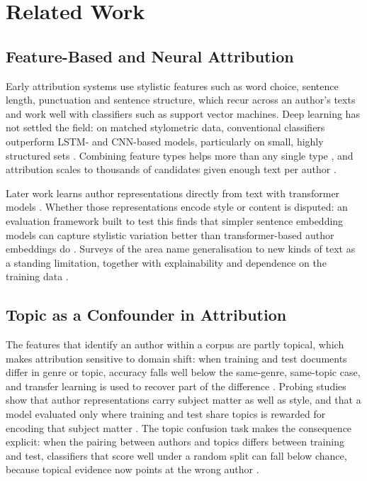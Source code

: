 \documentclass[conference]{IEEEtran}
\begin{document}
\section{Related Work}

\subsection{Feature-Based and Neural Attribution}

Early attribution systems use stylistic features such as word choice, sentence length, punctuation and sentence structure, which recur across an author's texts and work well with classifiers such as support vector machines. Deep learning has not settled the field: on matched stylometric data, conventional classifiers outperform LSTM- and CNN-based models, particularly on small, highly structured sets \cite{Sayoud2025}. Combining feature types helps more than any single type \cite{Suljic2024}, and attribution scales to thousands of candidates given enough text per author \cite{Bauersfeld2023}.

Later work learns author representations directly from text with transformer models \cite{Wang2023}. Whether those representations encode style or content is disputed: an evaluation framework built to test this finds that simpler sentence embedding models can capture stylistic variation better than transformer-based author embeddings do \cite{Terreau2021}. Surveys of the area name generalisation to new kinds of text as a standing limitation, together with explainability and dependence on the training data \cite{Huang2024,Habib2025}.

\subsection{Topic as a Confounder in Attribution}

The features that identify an author within a corpus are partly topical, which makes attribution sensitive to domain shift: when training and test documents differ in genre or topic, accuracy falls well below the same-genre, same-topic case, and transfer learning is used to recover part of the difference \cite{Barlas2021}. Probing studies show that author representations carry subject matter as well as style, and that a model evaluated only where training and test share topics is rewarded for encoding that subject matter \cite{Wegmann2022,Wang2023,Terreau2021}. The topic confusion task makes the consequence explicit: when the pairing between authors and topics differs between training and test, classifiers that score well under a random split can fall below chance, because topical evidence now points at the wrong author \cite{Altakrori2021}.
\end{document}
